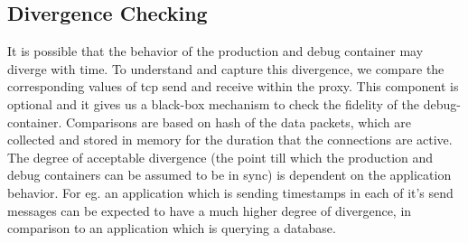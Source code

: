 
\subsection{Divergence Checking}
\label{sec:divergenceChecking}

It is possible that the behavior of the production and debug container may diverge with time.
To understand and capture this divergence, we compare the corresponding values of tcp send and receive within the proxy.
This component is optional and it gives us a black-box mechanism to check the fidelity of the debug-container.
Comparisons are based on hash of the data packets, which are collected and stored in memory for the duration that the connections are active.
The degree of acceptable divergence (the point till which the production and debug containers can be assumed to be in sync) is dependent on the application behavior. 
For eg. an application which is sending timestamps in each of it's send messages can be expected to have a much higher degree of divergence, in comparison to an application which is querying a database.

